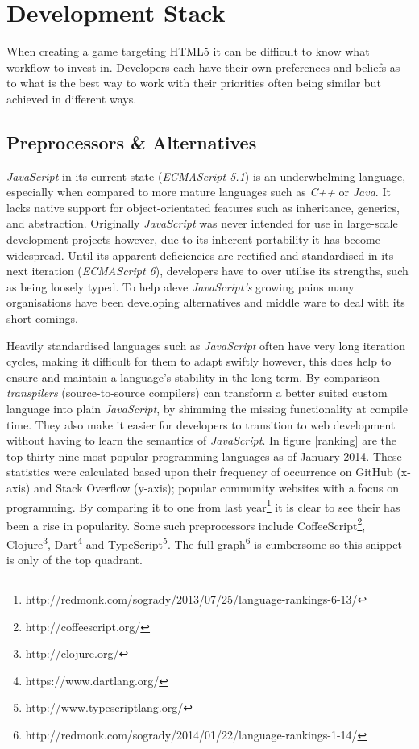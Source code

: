 \documentclass[final]{cmpreport}
\begin{document}
\section{Development Stack}
When creating a game targeting HTML5 it can be difficult to know what workflow to invest in. Developers each have their own preferences and beliefs as to what is the best way to work with their priorities often being similar but achieved in different ways.

\subsection{Preprocessors \& Alternatives}
\textit{JavaScript} in its current state (\textit{ECMAScript 5.1}) is an underwhelming language, especially when compared to more mature languages such as \textit{C++} or \textit{Java}. It lacks native support for object-orientated features such as inheritance, generics, and abstraction. Originally \textit{JavaScript} was never intended for use in large-scale development projects however, due to its inherent portability it has become widespread. Until its apparent deficiencies are rectified and standardised in its next iteration (\textit{ECMAScript 6}), developers have to over utilise its strengths, such as being loosely typed. To help aleve \textit{JavaScript's} growing pains many organisations have been developing alternatives and middle ware to deal with its short comings.

Heavily standardised languages such as \textit{JavaScript} often have very long iteration cycles, making it difficult for them to adapt swiftly however, this does help to ensure and maintain a language's stability in the long term. By comparison \textit{transpilers} (source-to-source compilers) can transform a better suited custom language into plain \textit{JavaScript}, by shimming the missing functionality at compile time. They also make it easier for developers to transition to web development without having to learn the semantics of \textit{JavaScript}. In figure \ref{ranking} are the top thirty-nine most popular programming languages as of January 2014. These statistics were calculated based upon their frequency of occurrence on GitHub (x-axis) and Stack Overflow (y-axis); popular community websites with a focus on programming. By comparing it to one from last year\footnote{http://redmonk.com/sogrady/2013/07/25/language-rankings-6-13/} it is clear to see their has been a rise in popularity. Some such preprocessors include CoffeeScript\footnote{http://coffeescript.org/}, Clojure\footnote{http://clojure.org/}, Dart\footnote{https://www.dartlang.org/} and TypeScript\footnote{http://www.typescriptlang.org/}. The full graph\footnote{http://redmonk.com/sogrady/2014/01/22/language-rankings-1-14/} is cumbersome so this snippet is only of the top quadrant.
\end{document}
